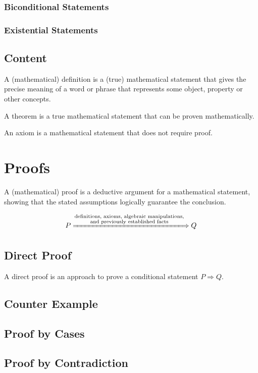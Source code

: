 \documentclass[a4paper]{article}
\begin{document}
\subsubsection{Biconditional Statements}

\subsubsection{Existential Statements}

\subsection{Content}

A (mathematical) definition is a (true) mathematical statement that gives the precise meaning of a word
or phrase that represents some object, property or other concepts.

A theorem is a true mathematical statement that can be proven mathematically.

An axiom is a mathematical statement that does not require proof.

\section{Proofs}

A (mathematical) proof is a deductive argument for a mathematical statement, showing that the stated assumptions logically guarantee the conclusion.

\[
P \xLongrightarrow{\substack{
		\text{definitions, axioms, algebraic manipulations,} \\
		\text{and previously established facts}
}} Q
\]

\subsection{Direct Proof}

A direct proof is an approach to prove a conditional statement $P \Rightarrow Q$.

\subsection{Counter Example}

\subsection{Proof by Cases}

\subsection{Proof by Contradiction}
\end{document}
